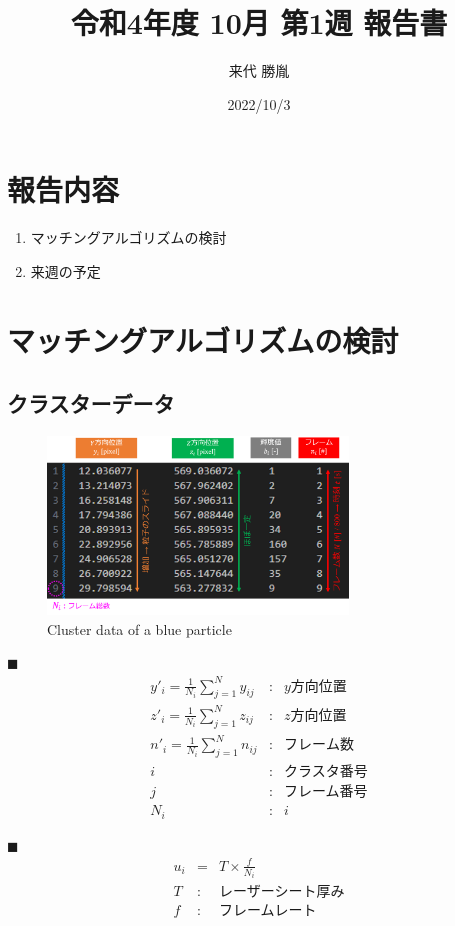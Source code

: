 \documentclass[twocolumn,a4j]{jsarticle}
\author{来代 勝胤}
\title{令和4年度 10月 第1週 報告書}
\date{2022/10/3}
\begin{document}
\columnseprule=0.1mm
\maketitle

\section*{報告内容}
\begin{enumerate}[1.]
  \item マッチングアルゴリズムの検討
  \item 来週の予定
\end{enumerate}

\section{マッチングアルゴリズムの検討}

\subsection{クラスターデータ}
\begin{figure}[htbp]
  \centering
  \includegraphics[width=80mm]{../images/cluster_data.png}
  \caption{Cluster data of a blue particle}
\end{figure}

$\blacksquare$\;
\begin{eqnarray*}
  y'_i = \frac{1}{N_i} \sum_{j=1}^{N} y_{ij} &:& y方向位置  \\
  z'_i = \frac{1}{N_i} \sum_{j=1}^{N} z_{ij} &:& z方向位置  \\
  n'_i = \frac{1}{N_i} \sum_{j=1}^{N} n_{ij} &:& フレーム数 \\
  i &:& \text{クラスタ番号}\\
  j &:& \text{フレーム番号}\\
  N_i &:& i
\end{eqnarray*}

$\blacksquare$\;
\begin{eqnarray*}
  u_i &=& T \times \frac{f}{N_i}\\
  T &:& \text{レーザーシート厚み} \\
  f &:& \text{フレームレート}\\
\end{eqnarray*}
\end{document}
